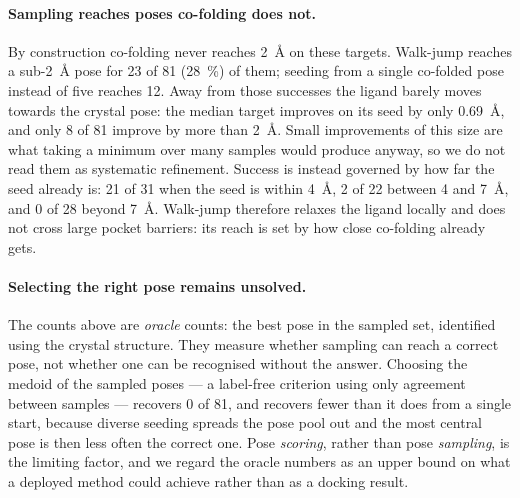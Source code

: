 \paragraph{Sampling reaches poses co-folding does not.}
By construction co-folding never reaches \SI{2}{\angstrom} on these targets.
Walk-jump reaches a sub-\SI{2}{\angstrom} pose for \num{23} of \num{81}
(\SI{28}{\percent}) of them; seeding from a single co-folded pose instead of five
reaches \num{12}. Away from those successes the ligand barely moves
towards the crystal pose: the median target improves on its seed by only
\SI{0.69}{\angstrom}, and only \num{8} of \num{81} improve by more than
\SI{2}{\angstrom}. Small improvements of this size are
what taking a minimum over many samples would produce anyway, so we do not read
them as systematic refinement. Success is instead governed by how far the
seed already is: \num{21} of \num{31} when the seed is within \SI{4}{\angstrom},
\num{2} of \num{22} between \SI{4}{} and \SI{7}{\angstrom}, and \num{0} of \num{28} beyond
\SI{7}{\angstrom}. Walk-jump therefore relaxes the ligand locally and does not
cross large pocket barriers: its reach is set by how close co-folding already
gets.

\paragraph{Selecting the right pose remains unsolved.}
The counts above are \emph{oracle} counts: the best pose in the sampled set,
identified using the crystal structure. They measure whether sampling can reach
a correct pose, not whether one can be recognised without the answer. Choosing
the medoid of the sampled poses --- a label-free criterion using only agreement
between samples --- recovers \num{0} of \num{81}, and recovers fewer than it does from a single start, because diverse seeding spreads the pose pool out and the most central pose is then less often the correct one. Pose
\emph{scoring}, rather than pose \emph{sampling}, is the limiting factor, and we
regard the oracle numbers as an upper bound on what a deployed method could
achieve rather than as a docking result.

